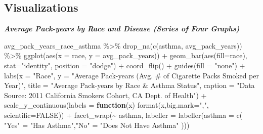 \documentclass[
]{article}
\newenvironment{Shaded}{\begin{snugshade}}{\end{snugshade}}
\newcommand{\AttributeTok}[1]{\textcolor[rgb]{0.77,0.63,0.00}{#1}}
\newcommand{\ConstantTok}[1]{\textcolor[rgb]{0.00,0.00,0.00}{#1}}
\newcommand{\ControlFlowTok}[1]{\textcolor[rgb]{0.13,0.29,0.53}{\textbf{#1}}}
\newcommand{\FunctionTok}[1]{\textcolor[rgb]{0.00,0.00,0.00}{#1}}
\newcommand{\NormalTok}[1]{#1}
\newcommand{\OtherTok}[1]{\textcolor[rgb]{0.56,0.35,0.01}{#1}}
\newcommand{\SpecialCharTok}[1]{\textcolor[rgb]{0.00,0.00,0.00}{#1}}
\newcommand{\StringTok}[1]{\textcolor[rgb]{0.31,0.60,0.02}{#1}}
\begin{document}
\hypertarget{visualizations}{%
\subsection{Visualizations}\label{visualizations}}

\emph{\textbf{Average Pack-years by Race and Disease (Series of Four
Graphs)}}

\begin{Shaded}
\begin{Highlighting}[]
\NormalTok{avg\_pack\_years\_race\_asthma }\SpecialCharTok{\%\textgreater{}\%}
  \FunctionTok{drop\_na}\NormalTok{(}\FunctionTok{c}\NormalTok{(asthma, avg\_pack\_years)) }\SpecialCharTok{\%\textgreater{}\%}
  \FunctionTok{ggplot}\NormalTok{(}\FunctionTok{aes}\NormalTok{(}\AttributeTok{x =}\NormalTok{ race, }\AttributeTok{y =}\NormalTok{ avg\_pack\_years)) }\SpecialCharTok{+}
  \FunctionTok{geom\_bar}\NormalTok{(}\FunctionTok{aes}\NormalTok{(}\AttributeTok{fill=}\NormalTok{race), }\AttributeTok{stat=}\StringTok{"identity"}\NormalTok{, }\AttributeTok{position =} \StringTok{"dodge"}\NormalTok{) }\SpecialCharTok{+}
  \FunctionTok{coord\_flip}\NormalTok{() }\SpecialCharTok{+}
  \FunctionTok{guides}\NormalTok{(}\AttributeTok{fill =} \StringTok{"none"}\NormalTok{) }\SpecialCharTok{+}
  \FunctionTok{labs}\NormalTok{(}\AttributeTok{x =} \StringTok{"Race"}\NormalTok{,}
       \AttributeTok{y =} \StringTok{"Average Pack{-}years (Avg. \# of Cigarette Packs Smoked per Year)"}\NormalTok{,}
  \AttributeTok{title =} \StringTok{"Average Pack{-}years by Race \& Asthma Status"}\NormalTok{,}
  \AttributeTok{caption =} \StringTok{"Data Source: 2011 California Smokers Cohort, CA Dept. of Health"}\NormalTok{) }\SpecialCharTok{+}
  \FunctionTok{scale\_y\_continuous}\NormalTok{(}\AttributeTok{labels =} \ControlFlowTok{function}\NormalTok{(x) }\FunctionTok{format}\NormalTok{(x,}\AttributeTok{big.mark=}\StringTok{","}\NormalTok{,}
                                                     \AttributeTok{scientific=}\ConstantTok{FALSE}\NormalTok{)) }\SpecialCharTok{+}
  \FunctionTok{facet\_wrap}\NormalTok{(}\SpecialCharTok{\textasciitilde{}}\NormalTok{ asthma, }\AttributeTok{labeller =} \FunctionTok{labeller}\NormalTok{(}\AttributeTok{asthma =}
                                             \FunctionTok{c}\NormalTok{( }\StringTok{"Yes"} \OtherTok{=} \StringTok{"Has Asthma"}\NormalTok{,}\StringTok{"No"} \OtherTok{=} \StringTok{"Does Not Have Asthma"}
\NormalTok{                                                     )))}
\end{Highlighting}
\end{Shaded}
\end{document}
